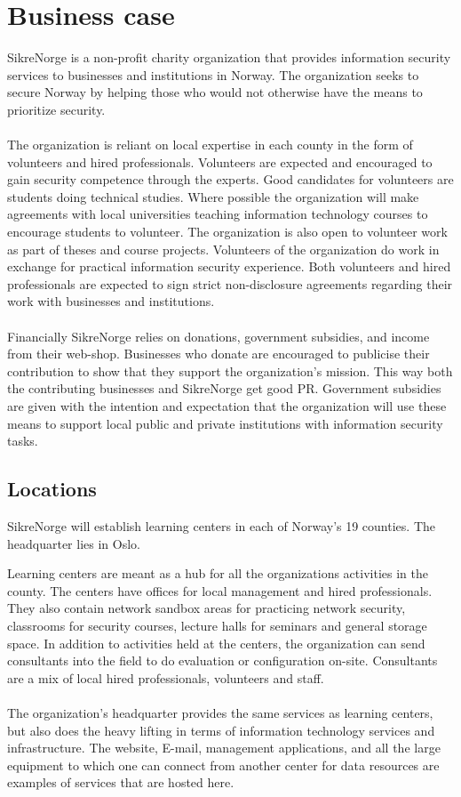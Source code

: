 \section{Business case}

SikreNorge is a non-profit charity organization that provides information security services to businesses and institutions in Norway. The organization seeks to secure Norway by helping those who would not otherwise have the means to prioritize security.
\\
\\
The organization is reliant on local expertise in each county in the form of volunteers and hired professionals. Volunteers are expected and encouraged to gain security competence through the experts. Good candidates for volunteers are students doing technical studies. Where possible the organization will make agreements with local universities teaching information technology courses to encourage students to volunteer. The organization is also open to volunteer work as part of theses and course projects. Volunteers of the organization do work in exchange for practical information security experience. Both volunteers and hired professionals are expected to sign strict non-disclosure agreements regarding their work with businesses and institutions.
\\
\\
Financially SikreNorge relies on donations, government subsidies, and income from their web-shop. Businesses who donate are encouraged to publicise their contribution to show that they support the organization's mission. This way both the contributing businesses and SikreNorge get good PR. Government subsidies are given with the intention and expectation that the organization will use these means to support local public and private institutions with information security tasks.
\subsection{Locations}

SikreNorge will establish learning centers in each of Norway's 19 counties. The headquarter lies in Oslo.

Learning centers are meant as a hub for all the organizations activities in the county. The centers have offices for local management and hired professionals. They also contain network sandbox areas for practicing network security, classrooms for security courses, lecture halls for seminars and general storage space. In addition to activities held at the centers, the organization can send consultants into the field to do evaluation or configuration on-site. Consultants are a mix of local hired professionals, volunteers and staff.
\\
\\
The organization's headquarter provides the same services as learning centers, but also does the heavy lifting in terms of information technology services and infrastructure. The website, E-mail, management applications, and all the large equipment to which one can connect from another center for data resources are examples of services that are hosted here.

